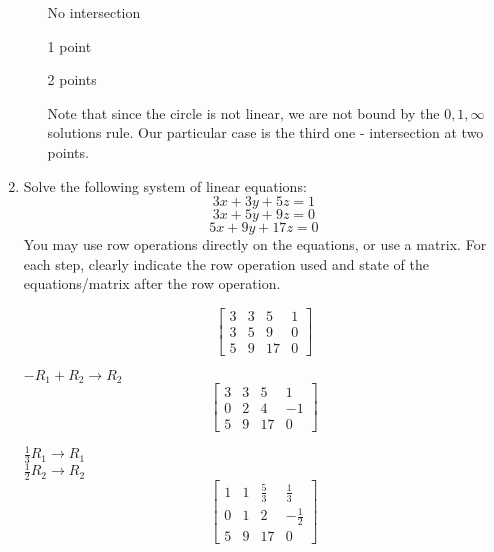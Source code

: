 \documentclass[letterpaper,12pt,fleqn]{article}
\begin{document}
\begin{enumerate}
\begin{enumerate}
\begin{minipage}{2in}
      No intersection
    \end{minipage}
    \begin{minipage}{2in}

      1 point
    \end{minipage}
    \begin{minipage}{2in}

      2 points
    \end{minipage}

    Note that since the circle is not linear, we are not bound by the
    $0,1,\infty$ solutions rule. Our particular case is the third one -
    intersection at two points.
  \end{enumerate}

\item Solve the following system of linear equations:
  \[3x+3y+5z=1\]
  \[3x+5y+9z=0\]
  \[5x+9y+17z=0\]
  You may use row operations directly on the equations, or use a matrix. For
  each step, clearly indicate the row operation used and state of the
  equations/matrix after the row operation.

  \[\left[\begin{array}{ccc|c}
      3 & 3 & 5 & 1 \\
      3 & 5 & 9 & 0 \\
      5 & 9 & 17 & 0
    \end{array}\right]\]

  $-R_1+R_2\to R_2$
  \[\left[\begin{array}{ccc|c}
      3 & 3 & 5 & 1 \\
      0 & 2 & 4 & -1 \\
      5 & 9 & 17 & 0
    \end{array}\right]\]

  $\frac{1}{3}R_1\to R_1$ \\
  $\frac{1}{2}R_2\to R_2$
  \[\left[\begin{array}{ccc|c}
      1 & 1 & \frac{5}{3} & \frac{1}{3} \\
      0 & 1 & 2 & -\frac{1}{2} \\
      5 & 9 & 17 & 0
    \end{array}\right]\]


\end{enumerate}
\end{document}
